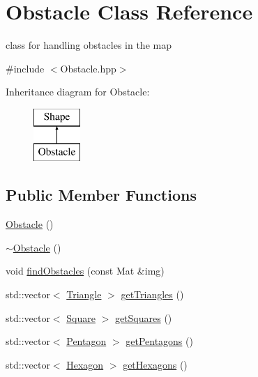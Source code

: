 \hypertarget{class_obstacle}{}\section{Obstacle Class Reference}
\label{class_obstacle}


class for handling obstacles in the map  




{\ttfamily \#include $<$Obstacle.\+hpp$>$}

Inheritance diagram for Obstacle\+:\begin{figure}[H]
\begin{center}
\leavevmode
\includegraphics[height=2.000000cm]{class_obstacle}
\end{center}
\end{figure}
\subsection*{Public Member Functions}
\begin{DoxyCompactItemize}
\item 
\mbox{\hyperlink{class_obstacle_a8f734072321fa06a7b7dae2d5f50f352}{Obstacle}} ()
\item 
\mbox{\hyperlink{class_obstacle_af2f9cc9c6cff75dca0974fd5ac4f71a9}{$\sim$\+Obstacle}} ()
\item 
void \mbox{\hyperlink{class_obstacle_ae333b23b742b38e50be13bc7aec2da5b}{find\+Obstacles}} (const Mat \&img)
\item 
std\+::vector$<$ \mbox{\hyperlink{class_triangle}{Triangle}} $>$ \mbox{\hyperlink{class_obstacle_a4b995e62a7aece596b2e42c63cdf5e28}{get\+Triangles}} ()
\item 
std\+::vector$<$ \mbox{\hyperlink{class_square}{Square}} $>$ \mbox{\hyperlink{class_obstacle_a53daef38dbe68e85696abc8ed03cf4b2}{get\+Squares}} ()
\item 
std\+::vector$<$ \mbox{\hyperlink{class_pentagon}{Pentagon}} $>$ \mbox{\hyperlink{class_obstacle_a2a3f85aa41ff39922c3994154fa8a7c1}{get\+Pentagons}} ()
\item 
std\+::vector$<$ \mbox{\hyperlink{class_hexagon}{Hexagon}} $>$ \mbox{\hyperlink{class_obstacle_a472a93843d84f1275c5b9cd57aa53850}{get\+Hexagons}} ()
\end{DoxyCompactItemize}


